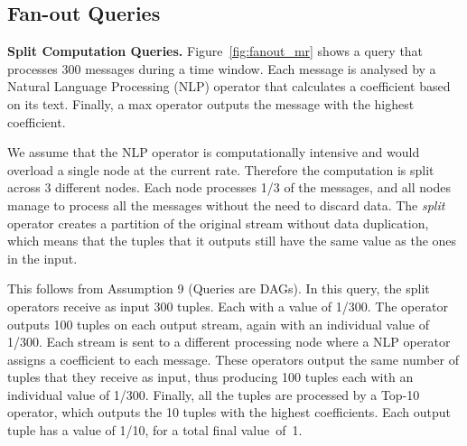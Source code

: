 \subsection*{Fan-out Queries}

\textbf{Split Computation Queries.} Figure~\ref{fig:fanout_mr} shows a query that processes 300 messages
during a time window. Each message is analysed by a Natural Language Processing (NLP) operator that calculates a
coefficient based on its text. Finally, a max operator outputs the message with the highest coefficient. 

We assume that the NLP operator is computationally intensive and would overload a single node at the
current rate. Therefore the computation is split across 3 different nodes. Each node processes 1/3 of
the messages, and all nodes manage to process all the messages without the need to discard data.
The \textit{split} operator creates a partition of the original stream without data
duplication, which means that the tuples that it outputs still have the same \sic value as the ones in
the input.

This follows from Assumption 9 (Queries are DAGs). In this query, the split operators receive as input
300 tuples. Each with a \sic value of 1/300.  The operator outputs 100 tuples on each output stream,
again with an individual \sic value of 1/300. Each stream is sent to a different processing node where a
NLP operator assigns a coefficient to each message. These operators output the same number of tuples
that they receive as input, thus producing 100 tuples each with an individual \sic value of 1/300.
Finally, all the tuples are processed by a Top-10 operator, which outputs the 10 tuples with the
highest coefficients. Each output tuple has a \sic value of 1/10, for a total final \sic value~of~1.


